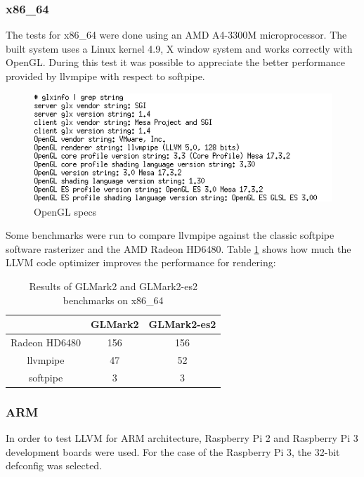 \documentclass[12pt,a4paper,oneside]{article}
\begin{document}
\subsubsection*{x86\_64}
The tests for x86\_64 were done using an AMD A4-3300M microprocessor. The built
system uses a Linux kernel 4.9, X window system and works correctly with OpenGL.
During this test it was possible to appreciate the better performance provided by
llvmpipe with respect to softpipe.
\begin{figure}[H]
\centering
  \includegraphics[scale=0.75]{img/llvmpipe-glspecs.png}
  \caption{OpenGL specs}
  \label{fig:llvmpipe-glspecs}
\end{figure}
Some benchmarks were run to compare llvmpipe against the classic softpipe software
rasterizer and the AMD Radeon HD6480. Table \ref{tab:glmark2_x86} shows how much
the LLVM code optimizer improves the performance for rendering:

\begin{table}[h!]
  \begin{center}
    \caption{Results of GLMark2 and GLMark2-es2 benchmarks on x86\_64}
    \label{tab:glmark2_x86}
    \begin{tabular}{ c |c c }
    & {GLMark2} & {GLMark2-es2} \\
    \hline
    Radeon HD6480 & 156 & 156 \\
    llvmpipe & 47 & 52 \\
    softpipe & 3 & 3 \\
    \end{tabular}
  \end{center}
\end{table}


\subsubsection*{ARM}
In order to test LLVM for ARM architecture, Raspberry Pi 2 and Raspberry Pi 3
development boards were used. For the case of the Raspberry Pi 3, the 32-bit
defconfig was selected.
\end{document}

